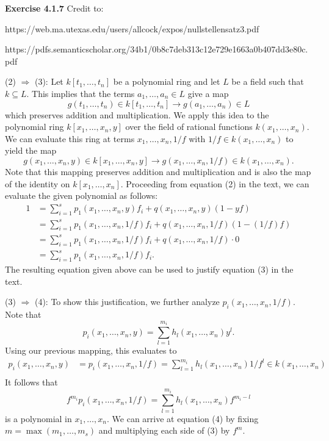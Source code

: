 \documentclass[12pt,oneside]{article}
\newenvironment{exercise}[1]{\vspace{.1in}\noindent\textbf{Exercise #1 \hspace{.05em}}}{}
\begin{document}
\begin{exercise}{4.1.7}
    Credit to:
    
    \bigskip
    https://web.ma.utexas.edu/users/allcock/expos/nullstellensatz3.pdf
    
    \bigskip
    https://pdfs.semanticscholar.org/34b1/0b8c7deb313c12e729e1663a0b407dd3e80c.pdf
    
    \bigskip
    (2) $\Rightarrow$ (3): Let $k[t_1, \ldots, t_n]$ be a polynomial ring and let $L$ be 
    a field such that $k \subseteq L$. This implies that the terms $a_1, \ldots, a_n \in L$
    give a map 
    \[
        g(t_1,\ldots,t_n) \in k[t_1,\ldots,t_n] \rightarrow g(a_1,\ldots,a_n) \in L
    \]
    which preserves addition and multiplication. We apply this idea to the polynomial ring 
    $k[x_1,\ldots,x_n,y]$ over the field of rational functions $k(x_1,\ldots,x_n)$. We 
    can evaluate this ring at terms $x_1,\ldots,x_n,1/f$ with $1/f \in k(x_1,\ldots,x_n)$
    to yield the map 
    \[
        g(x_1,\ldots,x_n,y) \in k[x_1,\ldots,x_n,y] \rightarrow g(x_1,\ldots,x_n, 1/f) \in k(x_1,\ldots,x_n).
    \]
    Note that this mapping preserves addition and multiplication and is also the map of 
    the identity on $k[x_1,\ldots,x_n]$. Proceeding from equation (2) in the text, we can 
    evaluate the given polynomial as follows:
    \begin{align*}
        1   &= \sum_{i=1}^sp_1(x_1,\ldots,x_n,y)f_i+q(x_1,\ldots,x_n,y)(1-yf)\\
            &= \sum_{i=1}^sp_1(x_1,\ldots,x_n,1/f)f_i+q(x_1,\ldots,x_n,1/f)(1-(1/f)f)\\
            &= \sum_{i=1}^sp_1(x_1,\ldots,x_n,1/f)f_i+q(x_1,\ldots,x_n,1/f)\cdot 0\\
            &= \sum_{i=1}^sp_1(x_1,\ldots,x_n,1/f)f_i.
    \end{align*}
    The resulting equation given above can be used to justify equation (3) in the text.
    
    \bigskip
    (3) $\Rightarrow$ (4): To show this justification, we further analyze $p_i(x_1,\ldots,x_n,1/f)$.
    Note that 
    \[
        p_i(x_1,\ldots,x_n,y) = \sum_{l=1}^{m_i}h_l(x_1,\ldots,x_n)y^l.
    \]
    Using our previous mapping, this evaluates to 
    \begin{align*}
        p_i(x_1,\ldots,x_n,y)   &= p_i(x_1,\ldots,x_n,1/f) = \sum_{l=1}^{m_i}h_l(x_1,\ldots,x_n)1/f^l \in k(x_1,\ldots,x_n)\\
    \end{align*}
    It follows that 
    \[
        f^{m_i}p_i(x_1,\ldots,x_n,1/f) = \sum_{l=1}^{m_i}h_l(x_1,\ldots,x_n)f^{m_i-l}
    \]
    is a polynomial in $x_1,\ldots, x_n$. We can arrive at equation (4) by fixing 
    $m = \max(m_1,\ldots,m_s)$ and multiplying each side of (3) by $f^m$.
\end{exercise}
\end{document}
